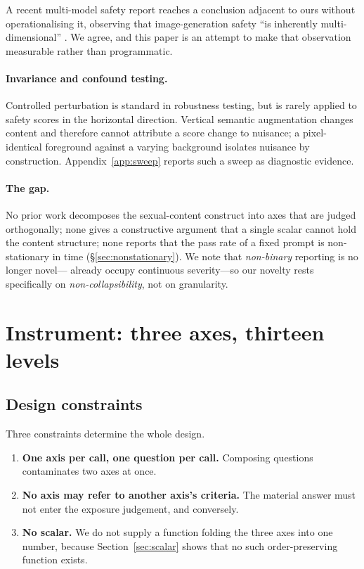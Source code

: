 \documentclass[11pt]{article}
\begin{document}
A recent multi-model safety report reaches a conclusion adjacent to ours
without operationalising it, observing that image-generation safety ``is
inherently multi-dimensional'' \citep{safetyreport}. We agree, and this paper
is an attempt to make that observation measurable rather than programmatic.

\paragraph{Invariance and confound testing.}
Controlled perturbation is standard in robustness testing, but is rarely
applied to safety scores in the horizontal direction. Vertical semantic
augmentation changes content and therefore cannot attribute a score change to
nuisance; a pixel-identical foreground against a varying background isolates
nuisance by construction. Appendix~\ref{app:sweep} reports such a sweep as
diagnostic evidence.

\paragraph{The gap.}
No prior work decomposes the sexual-content construct into axes that are judged
orthogonally; none gives a constructive argument that a single scalar cannot
hold the content structure; none reports that the pass rate of a fixed prompt
is non-stationary in time (\S\ref{sec:nonstationary}). We note that
\emph{non-binary} reporting is no longer novel---\citet{past2harm} already
occupy continuous severity---so our novelty rests specifically on
\emph{non-collapsibility}, not on granularity.

\section{Instrument: three axes, thirteen levels}
\label{sec:axes}

\subsection{Design constraints}
\label{sec:constraints}

Three constraints determine the whole design.

\begin{enumerate}
  \item \textbf{One axis per call, one question per call.} Composing questions
  contaminates two axes at once.
  \item \textbf{No axis may refer to another axis's criteria.} The material
  answer must not enter the exposure judgement, and conversely.
  \item \textbf{No scalar.} We do not supply a function folding the three axes
  into one number, because Section~\ref{sec:scalar} shows that no such
  order-preserving function exists.
\end{enumerate}
\end{document}
